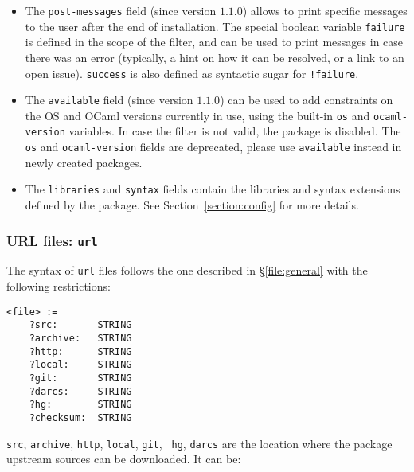 \documentclass[a4paper,10pt]{article}
\begin{document}
\begin{itemize}
\item The {\tt post-messages} field (since version $1.1.0$) allows to print
  specific messages to the user after the end of installation. The special
  boolean variable \verb+failure+ is defined in the scope of the filter, and can
  be used to print messages in case there was an error (typically, a hint on how
  it can be resolved, or a link to an open issue). \verb+success+ is also
  defined as syntactic sugar for \verb+!failure+.

\item The {\tt available} field (since version $1.1.0$) can be used to add
  constraints on the OS and OCaml versions currently in use, using the built-in
  \verb+os+ and \verb+ocaml-version+ variables. In case the filter is not valid,
  the package is disabled. The {\tt os} and {\tt ocaml-version} fields are
  deprecated, please use {\tt available} instead in newly created packages.

\item The {\tt libraries} and {\tt syntax} fields contain the
  libraries and syntax extensions defined by the package. See
  Section~\ref{section:config} for more details.

\end{itemize}

\subsubsection{URL files: {\tt url}}
\label{file:url}

The syntax of {\tt url} files follows the one described in
\S\ref{file:general} with the following restrictions:

{
\begin{Verbatim}[frame=single]
<file> :=
    ?src:       STRING
    ?archive:   STRING
    ?http:      STRING
    ?local:     STRING
    ?git:       STRING
    ?darcs:     STRING
    ?hg:        STRING
    ?checksum:  STRING
\end{Verbatim}
}

{\tt src}, {\tt archive}, {\tt http}, {\tt local}, {\tt git}, {\tt
  hg}, {\tt darcs} are the location where the package upstream sources
can be downloaded. It can be:
\end{document}
